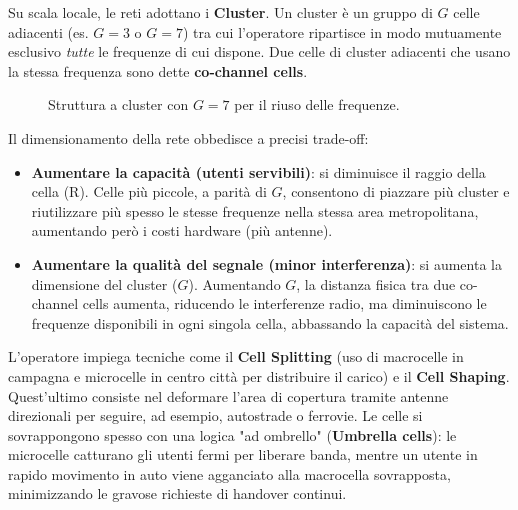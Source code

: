 Su scala locale, le reti adottano i \textbf{Cluster}. Un cluster è un gruppo di $G$ celle adiacenti (es. $G=3$ o $G=7$) tra cui l'operatore ripartisce in modo mutuamente esclusivo \textit{tutte} le frequenze di cui dispone.
Due celle di cluster adiacenti che usano la stessa frequenza sono dette \textbf{co-channel cells}.

\begin{figure}[H]
    \centering
    \caption{Struttura a cluster con $G=7$ per il riuso delle frequenze.}
    \label{fig:cluster-g7}
\end{figure}

Il dimensionamento della rete obbedisce a precisi trade-off:
\begin{itemize}
    \item \textbf{Aumentare la capacità (utenti servibili)}: si diminuisce il raggio della cella (R). Celle più piccole, a parità di $G$, consentono di piazzare più cluster e riutilizzare più spesso le stesse frequenze nella stessa area metropolitana, aumentando però i costi hardware (più antenne).
    \item \textbf{Aumentare la qualità del segnale (minor interferenza)}: si aumenta la dimensione del cluster ($G$). Aumentando $G$, la distanza fisica tra due co-channel cells aumenta, riducendo le interferenze radio, ma diminuiscono le frequenze disponibili in ogni singola cella, abbassando la capacità del sistema.
\end{itemize}

L'operatore impiega tecniche come il \textbf{Cell Splitting} (uso di macrocelle in campagna e microcelle in centro città per distribuire il carico) e il \textbf{Cell Shaping}. Quest'ultimo consiste nel deformare l'area di copertura tramite antenne direzionali per seguire, ad esempio, autostrade o ferrovie. 
Le celle si sovrappongono spesso con una logica "ad ombrello" (\textbf{Umbrella cells}): le microcelle catturano gli utenti fermi per liberare banda, mentre un utente in rapido movimento in auto viene agganciato alla macrocella sovrapposta, minimizzando le gravose richieste di handover continui.

